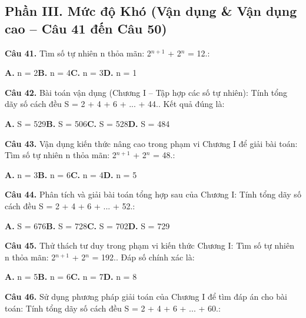 \documentclass[11pt,a4paper]{article}
\begin{document}
\subsection*{\color{accent} Phần III. Mức độ Khó (Vận dụng \& Vận dụng cao -- Câu 41 đến Câu 50)}
\textbf{\color{primary} Câu 41.} Tìm số tự nhiên n thỏa mãn: 2$^{n + 1}$ + 2$^{n}$ = 12.:\par
\hspace*{1.5em}\textbf{A.} n = 2\quad\quad \textbf{B.} n = 4\quad\quad \textbf{C.} n = 3\quad\quad \textbf{D.} n = 1\par\vspace{2pt}
\textbf{\color{primary} Câu 42.} Bài toán vận dụng (Chương I – Tập hợp các số tự nhiên): Tính tổng dãy số cách đều S = 2 + 4 + 6 + ... + 44.. Kết quả đúng là:\par
\hspace*{1.5em}\textbf{A.} S = 529\quad\quad \textbf{B.} S = 506\quad\quad \textbf{C.} S = 528\quad\quad \textbf{D.} S = 484\par\vspace{2pt}
\textbf{\color{primary} Câu 43.} Vận dụng kiến thức nâng cao trong phạm vi Chương I để giải bài toán: Tìm số tự nhiên n thỏa mãn: 2$^{n + 1}$ + 2$^{n}$ = 48.:\par
\hspace*{1.5em}\textbf{A.} n = 3\quad\quad \textbf{B.} n = 6\quad\quad \textbf{C.} n = 4\quad\quad \textbf{D.} n = 5\par\vspace{2pt}
\textbf{\color{primary} Câu 44.} Phân tích và giải bài toán tổng hợp sau của Chương I: Tính tổng dãy số cách đều S = 2 + 4 + 6 + ... + 52.:\par
\hspace*{1.5em}\textbf{A.} S = 676\quad\quad \textbf{B.} S = 728\quad\quad \textbf{C.} S = 702\quad\quad \textbf{D.} S = 729\par\vspace{2pt}
\textbf{\color{primary} Câu 45.} Thử thách tư duy trong phạm vi kiến thức Chương I: Tìm số tự nhiên n thỏa mãn: 2$^{n + 1}$ + 2$^{n}$ = 192.. Đáp số chính xác là:\par
\hspace*{1.5em}\textbf{A.} n = 5\quad\quad \textbf{B.} n = 6\quad\quad \textbf{C.} n = 7\quad\quad \textbf{D.} n = 8\par\vspace{2pt}
\textbf{\color{primary} Câu 46.} Sử dụng phương pháp giải toán của Chương I để tìm đáp án cho bài toán: Tính tổng dãy số cách đều S = 2 + 4 + 6 + ... + 60.:\par
\end{document}
